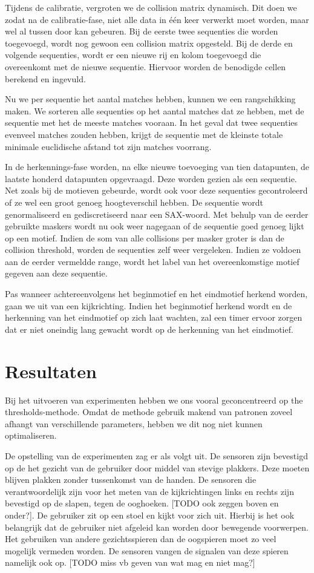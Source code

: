 \documentclass{article}
\begin{document}
Tijdens de calibratie, vergroten we de collision matrix dynamisch. Dit doen we zodat na de calibratie-fase, niet alle data in één keer verwerkt moet worden, maar wel al tussen door kan gebeuren. Bij de eerste twee sequenties die worden toegevoegd, wordt nog gewoon een collision matrix opgesteld. Bij de derde en volgende sequenties, wordt er een nieuwe rij en kolom toegevoegd die overeenkomt met de nieuwe sequentie. Hiervoor worden de benodigde cellen berekend en ingevuld.

Nu we per sequentie het aantal matches hebben, kunnen we een rangschikking maken. We sorteren alle sequenties op het aantal matches dat ze hebben, met de sequentie met het de meeste matches vooraan. In het geval dat twee sequenties evenveel matches zouden hebben, krijgt de sequentie met de kleinste totale minimale euclidische afstand tot zijn matches voorrang.

In de herkennings-fase worden, na elke nieuwe toevoeging van tien datapunten, de laatste honderd datapunten opgevraagd. Deze worden gezien als een sequentie. Net zoals bij de motieven gebeurde, wordt ook voor deze sequenties gecontroleerd of ze wel een groot genoeg hoogteverschil hebben. De sequentie wordt genormaliseerd en gediscretiseerd naar een SAX-woord. Met behulp van de eerder gebruikte maskers wordt nu ook weer nagegaan of de sequentie goed genoeg lijkt op een motief. Indien de som van alle collisions per masker groter is dan de collision threshold, worden de sequenties zelf weer vergeleken. Indien ze voldoen aan de eerder vermeldde range, wordt het label van het overeenkomstige motief gegeven aan deze sequentie.

Pas wanneer achtereenvolgens het beginmotief en het eindmotief herkend worden, gaan we uit van een kijkrichting. Indien het beginmotief herkend wordt en de herkenning van het eindmotief op zich laat wachten, zal een timer ervoor zorgen dat er niet oneindig lang gewacht wordt op de herkenning van het eindmotief.


\section{Resultaten}

Bij het uitvoeren van experimenten hebben we ons vooral geconcentreerd op the thresholds-methode. Omdat de methode gebruik makend van patronen zoveel afhangt van verschillende parameters, hebben we dit nog niet kunnen optimaliseren.

De opstelling van de experimenten zag er als volgt uit. De sensoren zijn bevestigd op de het gezicht van de gebruiker door middel van stevige plakkers. Deze moeten blijven plakken zonder tussenkomst van de handen. De sensoren die verantwoordelijk zijn voor het meten van de kijkrichtingen links en rechts zijn bevestigd op de slapen, tegen de ooghoeken. [TODO ook zeggen boven en onder?]. De gebruiker zit op een stoel en kijkt voor zich uit. Hierbij is het ook belangrijk dat de gebruiker niet afgeleid kan worden door bewegende voorwerpen. Het gebruiken van andere gezichtsspieren dan de oogspieren moet zo veel mogelijk vermeden worden. De sensoren vangen de signalen van deze spieren namelijk ook op. [TODO miss vb geven van wat mag en niet mag?]
\end{document}
